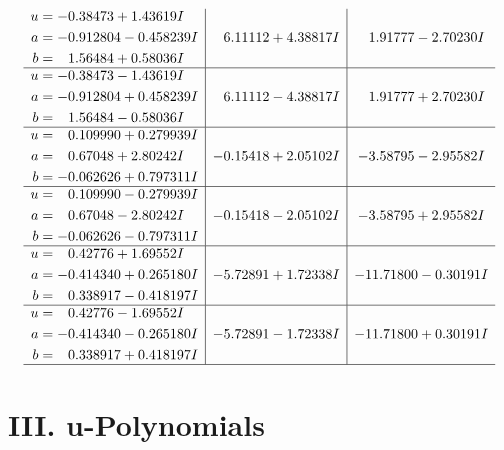 \documentclass[1p]{elsarticle_modified}
\theoremstyle{definition}
\begin{document}
$$\begin{array}{c|c|c}
\begin{aligned}
u &= -0.38473 + 1.43619 I \\
a &= -0.912804 - 0.458239 I \\
b &= \phantom{-}1.56484 + 0.58036 I\end{aligned}
 & \phantom{-}6.11112 + 4.38817 I & \phantom{-}1.91777 - 2.70230 I \\ \hline\begin{aligned}
u &= -0.38473 - 1.43619 I \\
a &= -0.912804 + 0.458239 I \\
b &= \phantom{-}1.56484 - 0.58036 I\end{aligned}
 & \phantom{-}6.11112 - 4.38817 I & \phantom{-}1.91777 + 2.70230 I \\ \hline\begin{aligned}
u &= \phantom{-}0.109990 + 0.279939 I \\
a &= \phantom{-}0.67048 + 2.80242 I \\
b &= -0.062626 + 0.797311 I\end{aligned}
 & -0.15418 + 2.05102 I & -3.58795 - 2.95582 I \\ \hline\begin{aligned}
u &= \phantom{-}0.109990 - 0.279939 I \\
a &= \phantom{-}0.67048 - 2.80242 I \\
b &= -0.062626 - 0.797311 I\end{aligned}
 & -0.15418 - 2.05102 I & -3.58795 + 2.95582 I \\ \hline\begin{aligned}
u &= \phantom{-}0.42776 + 1.69552 I \\
a &= -0.414340 + 0.265180 I \\
b &= \phantom{-}0.338917 - 0.418197 I\end{aligned}
 & -5.72891 + 1.72338 I & -11.71800 - 0.30191 I \\ \hline\begin{aligned}
u &= \phantom{-}0.42776 - 1.69552 I \\
a &= -0.414340 - 0.265180 I \\
b &= \phantom{-}0.338917 + 0.418197 I\end{aligned}
 & -5.72891 - 1.72338 I & -11.71800 + 0.30191 I\\
 \hline 
 \end{array}$$\newpage
\newpage\renewcommand{\arraystretch}{1}
\centering \section*{ III. u-Polynomials}
\end{document}
